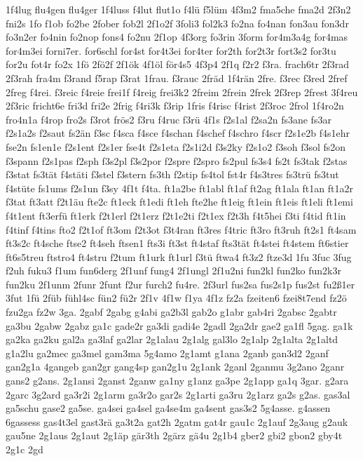 {1f4lug
flu4gen
flu4ger
1f4luss
f4lut
flut1o
f4lü
f5lüm
4f3m2
fma5che
fma2d
2f3n2
fni2s
1fo
f1ob
fo2be
2fober
fob2l
2f1o2f
3foli3
fol2k3
fo2na
fo4nan
fon3au
fon3dr
fo3n2er
fo4nin
fo2nop
fons4
fo2nu
2f1op
4f3org
fo3rin
3form
for4m3a4g
for4mas
for4m3ei
forni7er.
for6schl
for4st
for4t3ei
for4ter
for2th
for2t3r
fort3s2
for3tu
for2u
fot4r
fo2x
1fö
2fö2f
2f1ök
4f1öl
för4s5
4f3p4
2f1q
f2r2
f3ra.
frach6tr
2f3rad
2f3rah
fra4m
f3rand
f5rap
f3rat
1frau.
f3rauc
2fräd
1f4rän
2fre.
f3rec
f3red
2fref
2freg
f4rei.
f3reic
f4reie
frei1f
f4reig
frei3k2
2freim
2frein
2frek
2f3rep
2frest
3f4reu
2f3ric
fricht6e
fri3d
fri2e
2frig
f4ri3k
f3rip
1fris
f4risc
f4rist
2f3roc
2frol
1f4ro2n
fro4n1a
f4rop
fro2s
f3rot
frös2
f3ru
f4ruc
f3rü
4f1s
f2s1al
f2sa2n
fs3ane
fs3ar
f2s1a2s
f2saut
fs2än
f3sc
f4sca
f4sce
f4schan
f4schef
f4schro
f4scr
f2s1e2b
f4s1ehr
fse2n
fs1en1e
f2s1ent
f2s1er
fse4t
f2s1eta
f2s1i2d
f3s2ky
f2s1o2
f3soh
f3sol
fs2on
f3spann
f2s1pas
f2sph
f3s2pl
f3s2por
f2spre
f2spro
fs2pul
fs3s4
fs2t
fs3tak
f2stas
f3stat
fs3tät
f4stäti
f3stel
f3stern
fs3th
f2stip
fs4tol
fst4r
f4s3tres
fs3trü
fs3tut
f4stüte
fs1ums
f2s1un
f3sy
4f1t
f4ta.
ft1a2be
ft1abl
ft1af
ft2ag
ft1ala
ft1an
ft1a2r
f3tat
ft3att
f2t1äu
fte2c
ft1eck
ft1edi
ft1eh
fte2he
ft1eig
ft1ein
ft1eis
ft1eli
ft1emi
f4t1ent
ft3erfü
ft1erk
f2t1erl
f2t1erz
f2t1e2ti
f2t1ex
f2t3h
f4t5hei
f3ti
f4tid
ft1in
f4tinf
f4tins
fto2
f2t1of
ft3om
f2t3ot
f3t4ran
ft3res
f4tric
ft3ro
ft3ruh
ft2s1
ft4sam
ft3s2c
ft4sche
ftse2
ft4seh
ftsen1
fts3i
ft3st
ft4staf
fts3tät
ft4stei
ft4stem
ft6stier
ft6s5treu
ftstro4
ft4stru
f2tum
ft1urk
ft1url
f3tü
ftwa4
ft3z2
ftze3d
1fu
3fuc
3fug
f2uh
fuku3
f1um
fun6derg
2f1unf
fung4
2f1ungl
2f1u2ni
fun2kl
fun2ko
fun2k3r
fun2ku
2f1unm
2funr
2funt
f2ur
furch2
fu4re.
2f3url
fus2sa
fus2s1p
fus2st
fu2ß1er
3fut
1fü
2füb
fühl4sc
fün2
fü2r
2f1v
4f1w
f1ya
4f1z
fz2a
fzeiten6
fzei8t7end
fz2ö
fzu2ga
fz2w
3ga.
2gabf
2gabg
g4abi
ga2b3l
gab2o
g1abr
gab4ri
2gabsc
2gabtr
ga3bu
2gabw
2gabz
ga1c
gade2r
ga3di
gadi4e
2gadl
2ga2dr
gae2
ga1fl
5gag.
ga1k
ga2ka
ga2ku
gal2a
ga3laf
ga2lar
2g1alau
2g1alg
gal3lo
2g1alp
2g1alta
2g1altd
g1a2lu
ga2mec
ga3mel
gam3ma
5g4amo
2g1amt
g1ana
2ganb
gan3d2
2ganf
gan2g1a
4gangeb
gan2gr
gang4sp
gan2g1u
2g1ank
2ganl
2ganmu
3g2ano
2ganr
gans2
g2ans.
2g1ansi
2ganst
2ganw
ga1ny
g1anz
ga3pe
2g1app
ga1q
3gar.
g2ara
2garc
3g2ard
ga3r2i
2g1arm
ga3r2o
gar2s
2g1arti
ga3ru
2g1arz
ga2s
g2as.
gas3al
ga5schu
gase2
ga5se.
ga4sei
ga4sel
ga4se4m
ga4sent
gas3s2
5g4asse.
g4assen
6gassess
gas4t3el
gast3rä
ga3t2a
gat2h
2gatm
gat4r
gau1c
2g1auf
2g3aug
g2auk
gau5ne
2g1aus
2g1aut
2g1äp
gär3th
2gärz
gä4u
2g1b4
gber2
gbi2
gbon2
gby4t
2g1c
2gd
}
